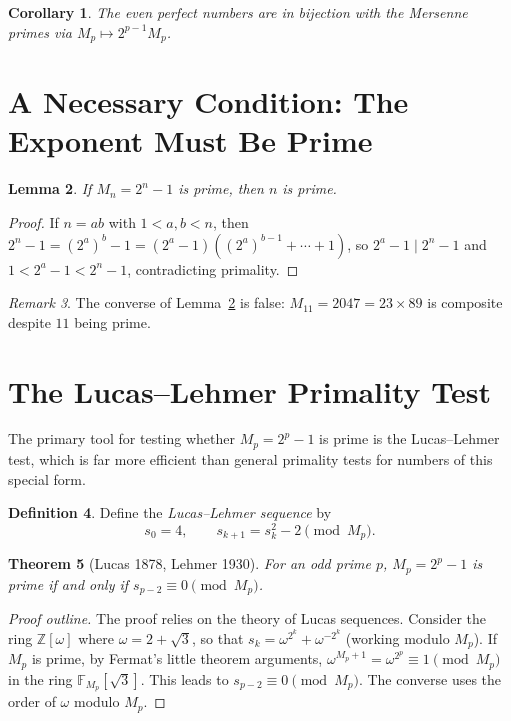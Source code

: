 \documentclass[12pt,a4paper]{amsart}
\newtheorem{theorem}{Theorem}[section]
\newtheorem{lemma}[theorem]{Lemma}
\newtheorem{corollary}[theorem]{Corollary}
\theoremstyle{definition}
\newtheorem{definition}[theorem]{Definition}
\theoremstyle{remark}
\newtheorem{remark}[theorem]{Remark}
\newcommand{\Z}{\mathbb{Z}}
\newcommand{\F}{\mathbb{F}}
\begin{document}
\begin{corollary}
The even perfect numbers are in bijection with the Mersenne primes via
$M_p \mapsto 2^{p-1} M_p$.
\end{corollary}

\section{A Necessary Condition: The Exponent Must Be Prime}

\begin{lemma}
\label{lem:exprime}
If $M_n = 2^n - 1$ is prime, then $n$ is prime.
\end{lemma}

\begin{proof}
If $n = ab$ with $1 < a, b < n$, then
$2^n - 1 = (2^a)^b - 1 = (2^a - 1)((2^a)^{b-1} + \cdots + 1)$,
so $2^a - 1 \mid 2^n - 1$ and $1 < 2^a - 1 < 2^n - 1$, contradicting primality.
\end{proof}

\begin{remark}
The converse of Lemma~\ref{lem:exprime} is false: $M_{11} = 2047 = 23 \times 89$
is composite despite $11$ being prime.
\end{remark}

\section{The Lucas--Lehmer Primality Test}

The primary tool for testing whether $M_p = 2^p - 1$ is prime is the
Lucas--Lehmer test, which is far more efficient than general primality tests
for numbers of this special form.

\begin{definition}
Define the \emph{Lucas--Lehmer sequence} by
\[
  s_0 = 4, \qquad s_{k+1} = s_k^2 - 2 \pmod{M_p}.
\]
\end{definition}

\begin{theorem}[Lucas 1878, Lehmer 1930]
\label{thm:LL}
For an odd prime $p$, $M_p = 2^p - 1$ is prime if and only if
$s_{p-2} \equiv 0 \pmod{M_p}$.
\end{theorem}

\begin{proof}[Proof outline]
The proof relies on the theory of Lucas sequences.
Consider the ring $\Z[\omega]$ where $\omega = 2 + \sqrt{3}$, so that
$s_k = \omega^{2^k} + \omega^{-2^k}$ (working modulo $M_p$).
If $M_p$ is prime, by Fermat's little theorem arguments,
$\omega^{M_p+1} = \omega^{2^p} \equiv 1 \pmod{M_p}$
in the ring $\F_{M_p}[\sqrt{3}]$.
This leads to $s_{p-2} \equiv 0 \pmod{M_p}$.
The converse uses the order of $\omega$ modulo $M_p$.
\end{proof}
\end{document}
